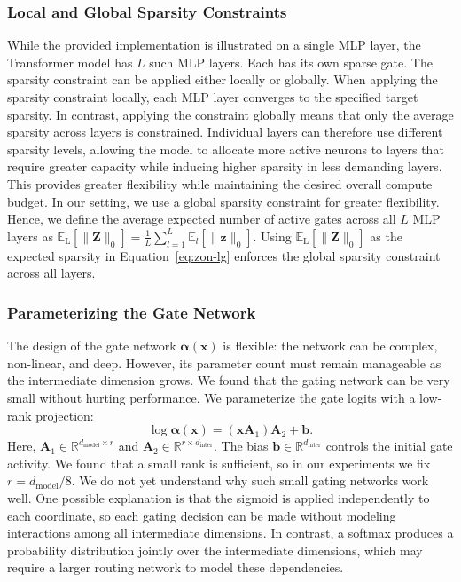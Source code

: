 \subsubsection{Local and Global Sparsity Constraints}
While the provided implementation is illustrated on a single MLP layer, the Transformer
model has $L$ such MLP layers. Each has its own sparse gate.
The sparsity constraint can be applied either locally or globally. When applying
the sparsity constraint locally, each MLP layer converges to the specified
target sparsity.
In contrast, applying the constraint globally means that only the average
sparsity across layers is constrained. Individual layers can therefore use
different sparsity levels, allowing the model to allocate more active neurons to
layers that require greater capacity while inducing higher sparsity
in less demanding layers. This provides greater flexibility while maintaining
the desired overall compute budget. In our setting, we use a global sparsity
constraint for greater flexibility. Hence, we define
the average expected number of active gates across all $L$ MLP layers as
$\mathbb{E}_{\text{L}}\!\left[\|\mathbf{Z}\|_0\right] = \frac{1}{L} \sum_{l=1}^{L}\mathbb{E}_{l}\!\left[\|\mathbf{z}\|_0\right].$
Using $\mathbb{E}_{\text{L}}\!\left[\|\mathbf{Z}\|_0\right]$ as the expected sparsity in Equation~\ref{eq:zon-lg}
enforces the global sparsity constraint across all layers.

\subsubsection{Parameterizing the Gate Network}
The design of the gate network $\boldsymbol{\alpha}(\mathbf{x})$
is flexible: the network can be complex, non-linear, and deep. However,
its parameter count must remain manageable as the intermediate dimension grows.
We found that the gating network can be very small without hurting performance.
We parameterize the gate logits with a low-rank projection:
\begin{equation}
    \log\boldsymbol{\alpha}(\mathbf{x})
    = (\mathbf{x}\mathbf{A}_1)\mathbf{A}_2 + \mathbf{b}.
\end{equation}
Here, $\mathbf{A}_1\in\mathbb{R}^{d_{\text{model}}\times r}$ and
$\mathbf{A}_2\in\mathbb{R}^{r\times d_{\text{inter}}}$.
The bias $\mathbf{b}\in\mathbb{R}^{d_{\text{inter}}}$ controls the initial gate activity.
We found that a small rank is sufficient, so in our experiments we fix $r = d_{\text{model}} / 8$.
We do not yet understand why such small gating networks work well. One possible
explanation is that the sigmoid is applied independently to each coordinate, so
each gating decision can be made without modeling interactions among all
intermediate dimensions. In contrast, a softmax produces a probability
distribution jointly over the intermediate dimensions, which may require a
larger routing network to model these dependencies.

